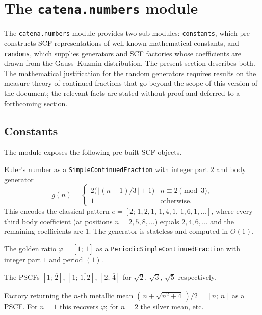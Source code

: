 \section{The \texttt{catena.numbers} module}
\label{sec:numbers}

The \texttt{catena.numbers} module provides two sub-modules:
\texttt{constants}, which pre-constructs SCF representations of well-known
mathematical constants, and \texttt{randoms}, which supplies generators
and SCF factories whose coefficients are drawn from the Gauss--Kuzmin
distribution.  The present section describes both.  The mathematical
justification for the random generators requires results on the measure
theory of continued fractions that go beyond the scope of this version of
the document; the relevant facts are stated without proof and deferred to
a forthcoming section.

\subsection{Constants}
\label{subsec:numbers-constants}

The module exposes the following pre-built SCF objects.

\begin{description}[leftmargin=2em, style=nextline]
  \item[$\mathtt{e}$]
    Euler's number as a \texttt{SimpleContinuedFraction} with integer
    part $2$ and body generator
    \[
      g(n) =
      \begin{cases}
        2\bigl(\lfloor(n+1)/3\rfloor + 1\bigr) & n \equiv 2 \pmod{3}, \\
        1 & \text{otherwise.}
      \end{cases}
    \]
    This encodes the classical pattern $e = [2;\,1,2,1,\,1,4,1,\,1,6,1,\ldots]$,
    where every third body coefficient (at positions $n = 2, 5, 8, \ldots$)
    equals $2, 4, 6, \ldots$ and the remaining coefficients are $1$.  The
    generator is stateless and computed in $O(1)$.

  \item[$\mathtt{phi}$]
    The golden ratio $\varphi = [1;\,\overline{1}]$ as a
    \texttt{PeriodicSimpleContinuedFraction} with integer part $1$ and
    period $(1)$.

  \item[$\mathtt{sqrt2}$, $\mathtt{sqrt3}$, $\mathtt{sqrt5}$]
    The PSCFs $[1;\,\overline{2}]$, $[1;\,\overline{1,2}]$,
    $[2;\,\overline{4}]$ for $\sqrt{2}$, $\sqrt{3}$, $\sqrt{5}$
    respectively.

  \item[$\mathtt{metallic\_mean}(n)$]
    Factory returning the $n$-th metallic mean
    $(\,n + \sqrt{n^2 + 4}\,)/2 = [n;\,\overline{n}]$ as a PSCF.  For $n = 1$
    this recovers $\varphi$; for $n = 2$ the silver mean, etc.
\end{description}

